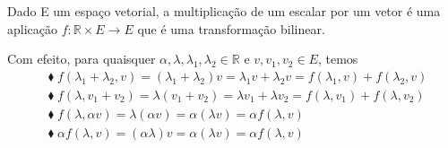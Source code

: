 \documentclass[../differential_forms.tex]{subfiles}
\begin{document}
\begin{example}
	Dado E um espaço vetorial, a multiplicação de um escalar por um vetor é uma aplicação \(f:\mathbb{R}\times E\rightarrow E\) que é uma transformação bilinear.

	Com efeito, para quaisquer \(\alpha , \lambda , \lambda_1,\lambda_2\in \mathbb{R}\) e \(v, v_1, v_2\in E\), temos
	\begin{align*}
		 & \blacklozenge\; f(\lambda_1+\lambda_2, v) = (\lambda_1+\lambda_2)v = \lambda_1 v + \lambda_2 v = f(\lambda_1, v)+f(\lambda_2, v) \\
		 & \blacklozenge\; f(\lambda, v_1+v_2) = \lambda(v_1+v_2) = \lambda v_1 + \lambda v_2 = f(\lambda, v_1)+f(\lambda, v_2)             \\
		 & \blacklozenge\; f(\lambda, \alpha v) = \lambda (\alpha v) = \alpha (\lambda v)= \alpha f(\lambda, v)                             \\
		 & \blacklozenge\; \alpha f(\lambda, v) = (\alpha \lambda) v = \alpha (\lambda v)= \alpha f(\lambda, v)                             \\
	\end{align*}
\end{example}
\end{document}
